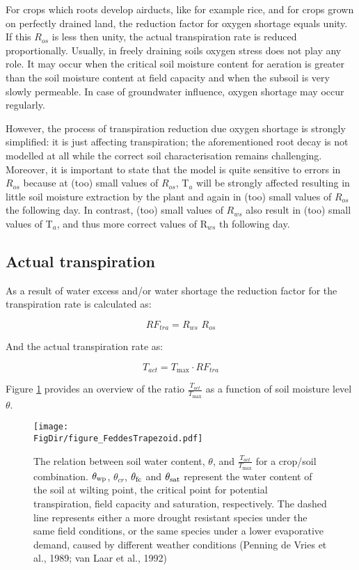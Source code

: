 For crops which roots develop airducts, like for example rice, and for crops grown on perfectly drained land, the reduction factor for oxygen shortage equals unity. If this $R_{os}$ is less then unity, the actual transpiration rate is reduced proportionally. Usually, in freely draining soils oxygen stress does not play any role. It may occur when the critical soil moisture content for aeration is greater than the soil moisture content at field capacity and when the subsoil is very slowly permeable. In case of groundwater influence, oxygen shortage may occur regularly. 

However, the process of transpiration reduction due oxygen shortage is strongly simplified: it is just affecting transpiration; the aforementioned root decay is not modelled at all while the correct soil characterisation remains challenging. Moreover, it is important to state that the model is quite sensitive to errors in $R_{os}$ because at (too) small values of $R_{os}$, T$_{a}$ will be strongly affected resulting in little soil moisture extraction by the plant and again in (too) small values of $R_{os}$ the following day. In contrast, (too) small values of $R_{ws}$ also result in (too) small values of T$_{a}$, and thus more correct values of R$_{ws}$ th following day.

\subsection{Actual transpiration}
As a result of water excess and/or water shortage the reduction factor for the transpiration rate is
calculated as:

\begin{equation}
\label{eq:6.14}
RF_{tra} = R_{ws} \,\, R_{os}
\end{equation}

And the actual transpiration rate as:

\begin{equation}
\label{eq:Tact}
T_{act} = T_{\max} \cdot RF_{tra}
\end{equation}

Figure \ref{fig:TaTp_vs_soilmoisture} provides an overview of the ratio $\frac{T_{act}}{T_{\max}}$ as
a function of soil moisture level $\theta$. 


\begin{figure}[p]
	\centering
	\texttt{[image: \\FigDir/figure\_FeddesTrapezoid.pdf]}
	\caption{The relation between soil water content, $\theta$, and  $\frac{T_{act}}{T_{\max}}$ for a crop/soil combination. $\theta_{{\rm wp}}$, $\theta_{cr}$, $\theta_{{\rm fc}}$ and $\theta_{{\rm sat}}$ represent the water content of the soil at wilting point, the critical point for potential transpiration, field capacity and saturation, respectively. The dashed line represents either a more drought resistant species under the same field conditions, or the same species under a lower evaporative demand, caused by different weather conditions (Penning de Vries et al., 1989; van Laar et al., 1992)}
	\label{fig:TaTp_vs_soilmoisture}
\end{figure}

